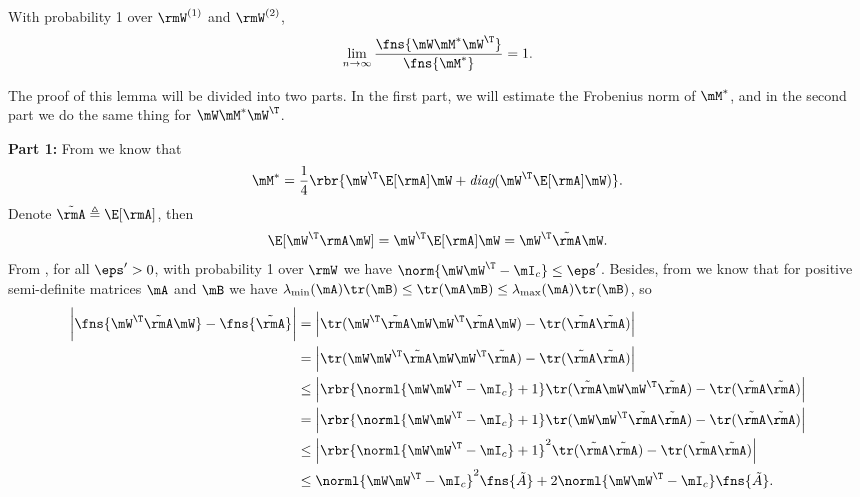 \begin{proofof}{}
\begin{lemma}
\label{lemma:F-norm-equal}
With probability 1 over $\rmW^{(1)}$ and $\rmW^{(2)}$,
\begin{equation}
\lim_{n\to\infty}\frac{\fns{\mW\mM^*\mW^\T}}{\fns{\mM^*}}=1.
\end{equation}

\end{lemma}
\begin{proofof}{}
The proof of this lemma will be divided into two parts. In the first part, we will estimate the Frobenius norm of $\mM^*$, and in the second part we do the same thing for $\mW\mM^*\mW^\T$.

\textbf{Part 1:} From  we know that
\begin{equation}
\mM^*=\frac14\rbr{\mW^\T\E[\rmA]\mW + \emph{diag}(\mW^\T\E[\rmA]\mW)}.
\end{equation}
Denote $\tilde{\rmA}\triangleq\E[\rmA]$, then
\begin{equation}
\E[\mW^\T\rmA\mW] = \mW^\T\E[\rmA]\mW = \mW^\T\tilde{\rmA}\mW.
\end{equation}
From , for all $\eps'>0$, with probability 1 over $\rmW$ we have $\norm{\mW\mW^\T-\mI_c}\leq\eps'$. Besides, from \cite{kleinman1968design} we know that for positive semi-definite matrices $\mA$ and $\mB$ we have $\lambda_{\min}(\mA)\tr(\mB)\leq \tr(\mA\mB)\leq \lambda_{\max}(\mA)\tr(\mB)$, so
\begin{equation}
\begin{split}
    \bigg|\fns{\mW^\T\tilde{\rmA}\mW} - \fns{\tilde{\rmA}}\bigg|
    &=\Big|\tr(\mW^\T\tilde{\rmA}\mW\mW^\T\tilde{\rmA}\mW)-\tr(\tilde{\rmA}\tilde{\rmA})\Big|\\
    &=\Big|\tr(\mW\mW^\T\tilde{\rmA}\mW\mW^\T\tilde{\rmA})-\tr(\tilde{\rmA}\tilde{\rmA})\Big|\\
    &\leq\Big|\rbr{\norml{\mW\mW^\T-\mI_c}+1}\tr(\tilde{\rmA}\mW\mW^\T\tilde{\rmA})-\tr(\tilde{\rmA}\tilde{\rmA})\Big|\\
    &=\Big|\rbr{\norml{\mW\mW^\T-\mI_c}+1}\tr(\mW\mW^\T\tilde{\rmA}\tilde{\rmA})-\tr(\tilde{\rmA}\tilde{\rmA})\Big|\\
    &\leq\Big|\rbr{\norml{\mW\mW^\T-\mI_c}+1}^2\tr(\tilde{\rmA}\tilde{\rmA})-\tr(\tilde{\rmA}\tilde{\rmA})\Big|\\
    &\leq\norml{\mW\mW^\T-\mI_c}^2\fns{\tilde{A}} + 2\norml{\mW\mW^\T-\mI_c}\fns{\tilde{A}}.
\end{split}
\end{equation}

\end{proofof}
\end{proofof}
